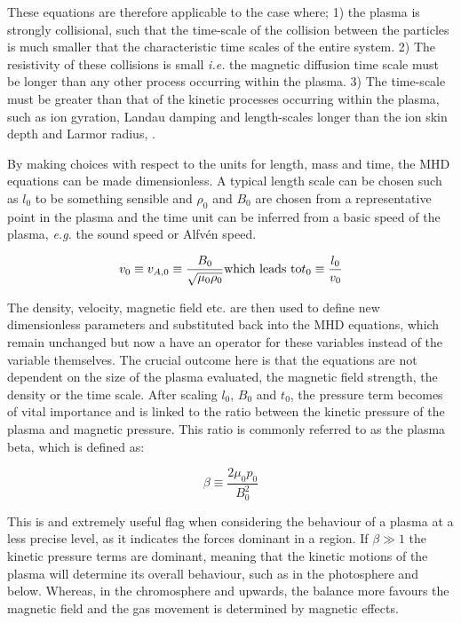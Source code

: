 \noindent These equations are therefore applicable to the case where; 1) the plasma is strongly collisional, such that the time-scale of the collision between the particles is much smaller that the characteristic time scales of the entire system.
2) The resistivity of these collisions is small \emph{i.e.} the magnetic diffusion time scale must be longer than any other process occurring within the plasma.
3) The time-scale must be greater than that of the kinetic processes occurring within the plasma, such as ion gyration, Landau damping and length-scales longer than the ion skin depth and Larmor radius, \cite{Goedbloed2004}.

By making choices with respect to the units for length, mass and time, the MHD equations can be made dimensionless.
A typical length scale can be chosen such as $l_0$ to be something sensible and $\rho_0$ and $B_0$ are chosen from a representative point in the plasma and the time unit can be inferred from a basic speed of the plasma, \emph{e.g.} the sound speed or Alfv{\'e}n speed.

\begin{equation}
	v_0 \equiv v_{A,0} \equiv \frac{B_0}{\sqrt{\mu_0\rho_0}} \textnormal{which leads to} t_0 \equiv \frac{l_0}{v_0} 
\end{equation}

\noindent The density, velocity, magnetic field etc. are then used to define new dimensionless parameters and substituted back into the MHD equations, which remain unchanged but now a have an operator for these variables instead of the variable themselves.
The crucial outcome here is that the equations are not dependent on the size of the plasma evaluated, the magnetic field strength, the density or the time scale.
After scaling $l_0$, $B_0$ and $t_0$, the pressure term becomes of vital importance and is linked to the ratio between the kinetic pressure of the plasma and magnetic pressure.
This ratio is commonly referred to as the plasma beta, which is defined as:

\begin{equation}
	\beta \equiv \frac{2\mu_0p_0}{B_0^2}
\end{equation} 

\noindent This is and extremely useful flag when considering the behaviour of a plasma at a less precise level, as it indicates the forces dominant in a region.
If $\beta \gg 1$ the kinetic pressure terms are dominant, meaning that the kinetic motions of the plasma will determine its overall behaviour, such as in the photosphere and below.
Whereas, in the chromosphere and upwards, the balance more favours the magnetic field and the gas movement is determined by magnetic effects.
 

